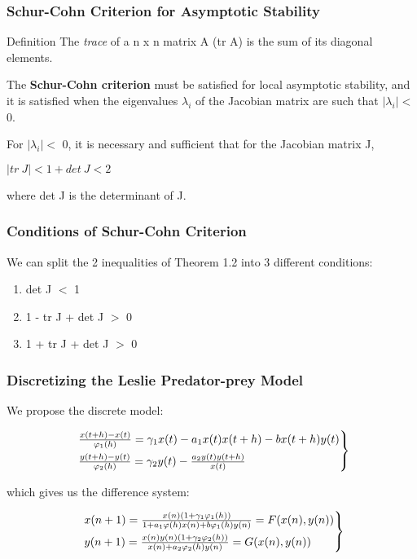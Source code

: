 \documentclass[xcolor={svgnames},hyperref={colorlinks,allcolors=Blue}]{beamer}
\begin{document}
\begin{frame}
\frametitle{Schur-Cohn Criterion for Asymptotic Stability}

\begin{block} {Definition}
The \textit{trace} of a n x n matrix A (tr A) is the sum of its diagonal elements.
\end{block}

\pause
The \textbf{Schur-Cohn criterion} must be satisfied for local asymptotic stability, and it is satisfied when the eigenvalues $\lambda_i$ of the Jacobian matrix are such that $|\lambda_i| <$ 0.

\pause
\begin{theorem}
For $|\lambda_i| <$ 0, it is necessary and sufficient that for the Jacobian matrix J,
    	\begin{center}
	$|tr ~J| < 1 + det ~J < 2$
	\end{center}
where det J is the determinant of J.
\end{theorem}

\end{frame}

\begin{frame}
\frametitle{Conditions of Schur-Cohn Criterion}
We can split the 2 inequalities of Theorem 1.2 into 3 different conditions:
\pause
\begin{enumerate}
	\item det J $<$ 1 \pause
	\item 1 - tr J + det J $>$ 0 \pause
	\item 1 + tr J + det J $>$ 0
\end{enumerate}

\end{frame}

\begin{frame}
\frametitle{Discretizing the Leslie Predator-prey Model}

We propose the discrete model:

	\begin{equation}
		\begin{rcases}
		~\frac{x(t+h)-x(t)}{\varphi_1(h)} = \gamma_1x(t) - a_1x(t)x(t+h)-bx(t+h)y(t) \\
		~\frac{y(t+h)-y(t)}{\varphi_2(h)} = \gamma_2y(t) - \frac{a_2y(t)y(t+h)}{x(t)}
		\end{rcases}
	\end{equation}

\pause
which gives us the difference system:
	
	\begin{equation}
		\begin{rcases}
		~x(n+1) = \frac{x(n)(1+\gamma_1\varphi_1(h))}{1+a_1\varphi(h)x(n)+b\varphi_1(h)y(n)} = F(x(n),y(n)) \\
		~y(n+1) = \frac{x(n)y(n)(1+\gamma_2\varphi_2(h))}{x(n)+a_2\varphi_2(h)y(n)} = G(x(n),y(n))
		\end{rcases}
	\end{equation}

\end{frame}
\end{document}
